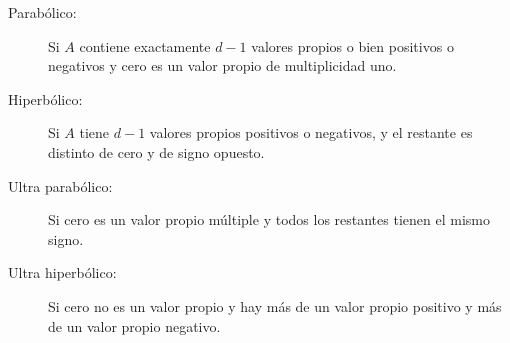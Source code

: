 \begin{definition}
\begin{description}
        \item[Parabólico:]

              Si $A$ contiene exactamente $d-1$ valores propios o bien
              positivos o negativos y cero es un valor propio de
              multiplicidad uno.

        \item[Hiperbólico:]

              Si $A$ tiene $d-1$ valores propios positivos o negativos,
              y el restante es distinto de cero y de signo opuesto.

        \item[Ultra parabólico:]

              Si cero es un valor propio múltiple y todos los restantes
              tienen el mismo signo.

        \item[Ultra hiperbólico:]

              Si cero no es un valor propio y hay más de un valor
              propio positivo y más de un valor propio negativo.
    \end{description}
\end{definition}

